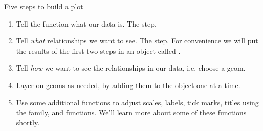 \documentclass[10pt]{beamer}\usepackage[]{graphicx}\usepackage[]{color}
\begin{document}
\begin{frame}{Five steps to build a plot}
	
\begin{enumerate}
	\item Tell the  function what our data is. The  step.  
\pause	\item  Tell  \textit{what} relationships we want to see. The  step. For convenience we will put the results of the first two steps in an object called .  
\pause	\item  Tell  \textit{how} we want to see the relationships in our data, i.e. choose a geom.  
\pause	\item  Layer on geoms as needed, by adding them to the  object one at a time.  
\pause	\item  Use some additional functions to adjust scales, labels, tick marks, titles using the  family,  and  functions. We'll learn more about some of these functions shortly.  
\end{enumerate}
\end{frame}
\end{document}
